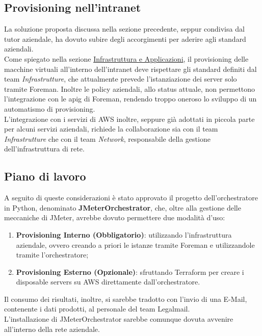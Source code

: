 \subsection{Provisioning nell'intranet}
La soluzione proposta discussa nella sezione precedente, seppur condivisa dal tutor aziendale, ha dovuto subire degli accorgimenti per aderire agli standard aziendali.\\
Come spiegato nella sezione \hyperref[subsec:infra]{Infrastruttura e Applicazioni}, il provisioning delle macchine virtuali all'interno dell'\gls{intranet} deve rispettare gli standard definiti dal team \textit{Infrastrutture}, che attualmente prevede l'istanziazione dei server solo tramite Foreman. Inoltre le policy aziendali, allo status attuale, non permettono l'integrazione con le \gls{apig} di Foreman, rendendo troppo oneroso lo sviluppo di un automatismo di provisioning. \\
L'integrazione con i servizi di AWS inoltre, seppure già adottati in piccola parte per alcuni servizi aziendali, richiede la collaborazione sia con il team \textit{Infrastrutture} che con il team \textit{Network}, responsabile della gestione dell'infrastruttura di rete.

\subsection{Piano di lavoro}
A seguito di queste considerazioni è stato approvato il progetto dell'orchestratore in Python, denominato \textbf{JMeterOrchestrator}, che, oltre alla gestione delle meccaniche di JMeter, avrebbe dovuto permettere due modalità d'uso:
\begin{enumerate}
	\item \textbf{Provisioning Interno (Obbligatorio)}: utilizzando l'infrastruttura aziendale, ovvero creando a priori le istanze tramite Foreman e utilizzandole tramite l'orchestratore;
	\item \textbf{Provisioning Esterno (Opzionale)}: sfruttando Terraform per creare i disposable servers su AWS direttamente dall'orchestratore.
\end{enumerate}
Il consumo dei risultati, inoltre, si sarebbe tradotto con l'invio di una E-Mail, contenente i dati prodotti, al personale del team Legalmail. \\
L'installazione di JMeterOrchestrator sarebbe comunque dovuta avvenire all'interno della rete aziendale.